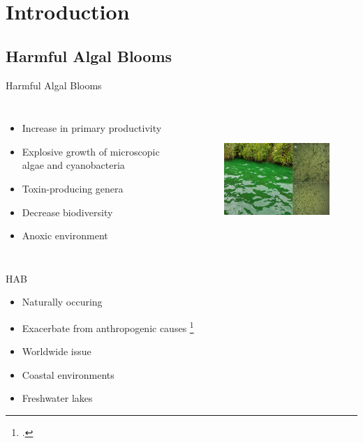 \section{Introduction}

\subsection{Harmful Algal Blooms}
\begin{frame}{Harmful Algal Blooms}

\begin{columns}

	\begin{itemize}
		\item Increase in primary productivity
		\item Explosive growth of microscopic algae and cyanobacteria
		\item Toxin-producing genera
		\item Decrease biodiversity
		\item Anoxic environment
	\end{itemize}

	\begin{figure}
		\hspace*{-1cm}
		\vspace*{-1cm}
		\includegraphics[width=2.4in,height=2in]{../figures/cyano.png}
	\end{figure}
\end{columns}

\end{frame}
\begin{frame}{HAB}

	\begin{itemize}
		\item Naturally occuring
		\item Exacerbate from anthropogenic causes \footcite{rastogi_cyanotoxin-microcystins:_2014}
		\item Worldwide issue
		\item Coastal environments
		\item Freshwater lakes
	\end{itemize}

\end{frame}

